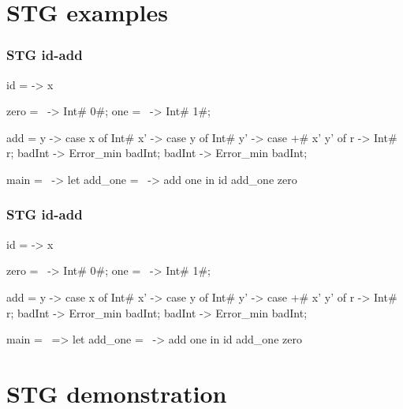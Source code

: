 \documentclass[bigger,aspectratio=169]{beamer}
\begin{document}
\section{STG examples}

\begin{frame}[fragile]
\frametitle{STG id-add}
\begin{center}

	\begin{haskellcode}
		id = \x -> x
	\end{haskellcode}
	\pause
	\begin{haskellcode}
		zero = \ -> Int# 0#;
		one  = \ -> Int# 1#;
	\end{haskellcode}
	\pause
	\begin{haskellcode}
		add = \x y -> case x of
		  Int# x' -> case y of
		    Int# y' -> case +# x' y' of
		      r -> Int# r;
		    badInt -> Error_min badInt;
		  badInt -> Error_min badInt;
	\end{haskellcode}
	\pause
	\begin{haskellcode}
		main = \ -> let add_one = \ -> add one
		            in id add_one zero
	\end{haskellcode}

\end{center}
\end{frame}


\begin{frame}[fragile]
\frametitle{STG id-add}
\begin{center}

	\begin{haskellcode}
		id = \x -> x
	\end{haskellcode}
	\begin{haskellcode}
		zero = \ -> Int# 0#;
		one  = \ -> Int# 1#;
	\end{haskellcode}
	\begin{haskellcode}
		add = \x y -> case x of
		  Int# x' -> case y of
		    Int# y' -> case +# x' y' of
		      r -> Int# r;
		    badInt -> Error_min badInt;
		  badInt -> Error_min badInt;
	\end{haskellcode}
	\begin{haskellcode}
		main = \ => let add_one = \ -> add one
		            in id add_one zero
	\end{haskellcode}

\end{center}
\end{frame}

\section{STG demonstration}
\end{document}
